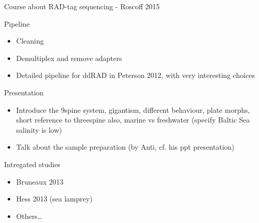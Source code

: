 \documentclass[presentation]{beamer}
\begin{document}
\begin{frame}[label=sec-1]{Course about RAD-tag sequencing - Roscoff 2015}
\begin{block}{Pipeline}
\begin{itemize}
\item Cleaning
\item Demultiplex and remove adapters
\item Detailed pipeline for ddRAD in Peterson 2012, with very interesting choices
\end{itemize}
\end{block}

\begin{block}{Presentation}
\begin{itemize}
\item Introduce the 9spine system, gigantism, different behaviour, plate morphs,
short reference to threespine also, marine vs freshwater (specify Baltic Sea
salinity is low)
\item Talk about the sample preparation (by Anti, cf. his ppt presentation)
\end{itemize}
\end{block}

\begin{block}{Intregated studies}
\begin{itemize}
\item Bruneaux 2013
\item Hess 2013 (sea lamprey)
\item Others\ldots{}
\end{itemize}
\end{block}
\end{frame}
\end{document}
